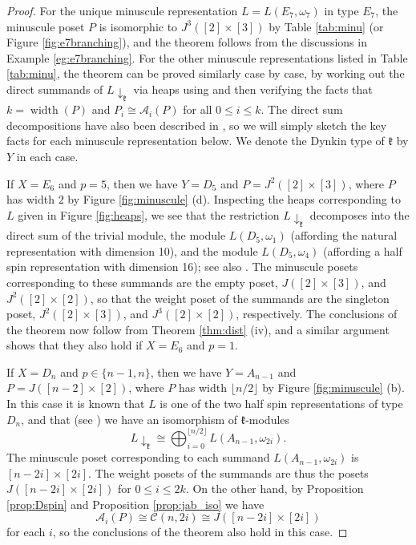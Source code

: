\documentclass[11pt]{amsart}
\theoremstyle{plain}
\theoremstyle{definition}
\theoremstyle{remark}
\numberwithin{equation}{section}
\newcommand{\fk}{{\mathfrak k}}
\newcommand{\cala}{\mathcal{A}}
\newcommand{\calc}{\mathcal{C}}
\newcommand{\res}{L\!\downarrow_\fk}
\DeclareMathOperator{\width}{\mathrm{width}}
\begin{document}
\begin{proof}
For the unique minuscule representation $L=L(E_7,\omega_7)$ in type $E_7$, the
minuscule poset $P$ is isomorphic to $J^3([2]\times [3])$ by Table
\ref{tab:minu} (or Figure \ref{fig:e7branching}), and the theorem follows from
the discussions in Example \ref{eg:e7branching}.  For the other minuscule
representations listed in Table \ref{tab:minu}, the theorem can be proved
similarly case by case, by working out the direct summands of $\res$ via heaps
using \cite[Proposition 8.2.9 (iv)]{green13} and then verifying the facts that
$k=\width(P)$ and $P_i\cong \cala_i(P)$ for all $0\le i\le k$.  The direct sum
decompositions have also been described in \cite[Section 8.2]{green13}, so we
will simply sketch the key facts for each minuscule representation below.  We
denote the Dynkin type of $\fk$ by $Y$ in each case.

If $X=E_6$ and $p=5$, then we have $Y=D_5$ and $P=J^2([2]\times [3])$, where $P$
has width $2$ by Figure \ref{fig:minuscule} (d). Inspecting the heaps
corresponding to $L$ given in Figure \ref{fig:heaps}, we see that the restriction
$\res$ decomposes into the direct sum of the trivial module, the module
$L(D_5,\omega_1)$ (affording the natural representation with dimension 10), and
the module $L(D_5,\omega_{4})$ (affording a half spin representation with
dimension 16); see also \cite[Exercise 8.2.17]{green13}. The minuscule posets
corresponding to these summands are the empty poset, $J([2]\times[3])$, and
$J^2([2]\times [2])$, so that the weight poset of the summands are the singleton
poset, $J^2([2]\times[3])$, and $J^3([2]\times[2])$, respectively. The
conclusions of the theorem now follow from Theorem \ref{thm:dist} (iv), and a
similar argument shows that they also hold if $X=E_6$ and $p=1$. 


If $X=D_n$ and $p\in \{n-1,n\}$, then we have $Y=A_{n-1}$ and
$P=J([n-2]\times[2])$, where $P$ has width $\lfloor n/2\rfloor$ by Figure
\ref{fig:minuscule} (b). In this case it is known that $L$ is one of the two
half spin representations of type $D_n$, and that (see \cite[Exercise
8.2.15]{green13}) we have an isomorphism of $\fk$-modules 
\[ \res \cong
    \bigoplus_{i = 0}^{\lfloor n/2 \rfloor} L(A_{n-1},\omega_{2i}).
\]
The minuscule poset corresponding to each summand $L(A_{n-1},\omega_{2i})$ is
$[n-2i]\times [2i]$. The weight posets of the summands are thus the posets
$J([n-2i]\times[2i])$ for $0\le i\le 2k$. 
On the other hand,
by
Proposition \ref{prop:Dspin}
and Proposition \ref{prop:jab_iso} we have  $$ \cala_i(P) \cong \calc(n, 2i) \cong
J([n-2i] \times [2i]) $$
for each $i$, so the conclusions of the theorem also hold in this case.


\end{proof}
\end{document}
